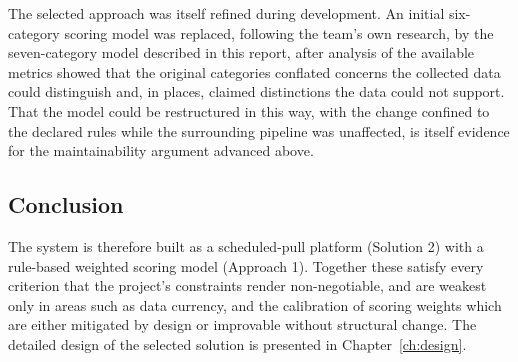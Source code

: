 The selected approach was itself refined during development. An initial
six-category scoring model was replaced, following the team's own research, by
the seven-category model described in this report, after analysis of the
available metrics showed that the original categories conflated concerns the
collected data could distinguish and, in places, claimed distinctions the
data could not support. That the model could be restructured in this way, with
the change confined to the declared rules while the surrounding pipeline was
unaffected, is itself evidence for the maintainability argument advanced above.

\subsection{Conclusion}
\label{subsec:formulation-conclusion}

The system is therefore built as a scheduled-pull platform (Solution 2) with a rule-based
weighted scoring model (Approach 1). Together these satisfy every criterion that the
project's constraints render non-negotiable, and are weakest only in areas such as
data currency, and the calibration of scoring weights which are either
mitigated by design or improvable without structural change. The detailed design
of the selected solution is presented in Chapter~\ref{ch:design}.